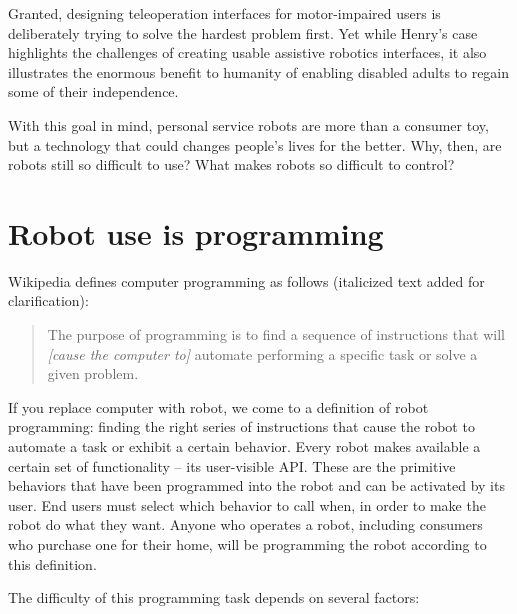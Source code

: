 \documentclass[10pt,twocolumn]{article}
\begin{document}
Granted, designing teleoperation interfaces for motor-impaired users is deliberately trying to solve the hardest problem first.  Yet while Henry's case highlights the challenges of creating usable assistive robotics interfaces, it also illustrates the enormous benefit to humanity of enabling disabled adults to regain some of their independence.

With this goal in mind, personal service robots are more than a consumer toy, but a technology that could changes people's lives for the better. Why, then, are robots still so difficult to use? What makes robots so difficult to control?

\section{Robot use is programming}

Wikipedia defines computer programming as follows (italicized text added for clarification):

\begin{quote}
The purpose of programming is to find a sequence of instructions that will {\it [cause the computer to]} automate performing a specific task or solve a given problem.
\end{quote}

If you replace computer with robot, we come to a definition of robot programming: finding the right series of instructions that cause the robot to automate a task or exhibit a certain behavior. Every robot makes available a certain set of functionality -- its user-visible API. These are the primitive behaviors that have been programmed into the robot and can be activated by its user. End users must select which behavior to call when, in order to make the robot do what they want. Anyone who operates a robot, including consumers who purchase one for their home, will be programming the robot according to this definition.

The difficulty of this programming task depends on several factors:
\end{document}
